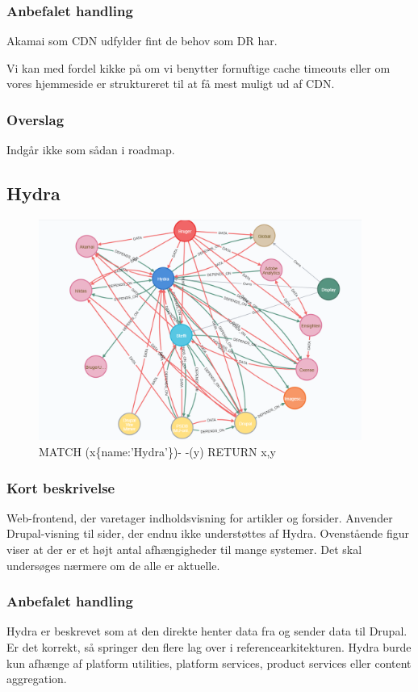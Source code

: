\documentclass{article}
\begin{document}
\subsubsection{Anbefalet handling}
Akamai som CDN udfylder fint de behov som DR har. 

Vi kan med fordel kikke på om vi benytter fornuftige cache timeouts eller om vores hjemmeside er struktureret til at få mest muligt ud af CDN.
\subsubsection{Overslag}
Indgår ikke som sådan i roadmap.



\subsection{Hydra}
\begin{figure}[h]
\includegraphics[width=300pt]{Hydra.PNG}
\caption{MATCH (x\{name:'Hydra'\})- -(y) RETURN x,y}
\end{figure}
\subsubsection{Kort beskrivelse}
Web-frontend, der varetager indholdsvisning for artikler og forsider. Anvender Drupal-visning til sider, der endnu ikke understøttes af Hydra.
Ovenstående figur viser at der er et højt antal afhængigheder til mange systemer. Det skal undersøges nærmere om de alle er aktuelle.
\subsubsection{Anbefalet handling}
Hydra er beskrevet som at den direkte henter data fra og sender data til Drupal. Er det korrekt, så springer den flere lag over i referencearkitekturen.
Hydra burde kun afhænge af platform utilities, platform services, product services eller content aggregation.
\end{document}

